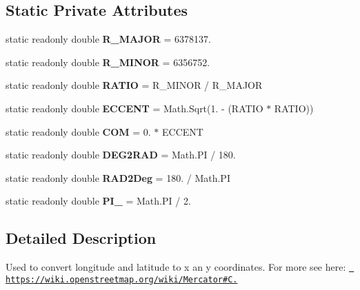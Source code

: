 \subsection*{Static Private Attributes}
\begin{DoxyCompactItemize}
\item 
\mbox{\label{class_mercator_projection_a68ee9a5cb453072e303f1ed6a4928ad4}} 
static readonly double {\bfseries R\+\_\+\+M\+A\+J\+OR} = 6378137.
\item 
\mbox{\label{class_mercator_projection_a8ddf9c3841452f1669e9f086a63a0660}} 
static readonly double {\bfseries R\+\_\+\+M\+I\+N\+OR} = 6356752.
\item 
\mbox{\label{class_mercator_projection_a56e34a362762f6a07456f8a9fe84b7e0}} 
static readonly double {\bfseries R\+A\+T\+IO} = R\+\_\+\+M\+I\+N\+OR / R\+\_\+\+M\+A\+J\+OR
\item 
\mbox{\label{class_mercator_projection_a488fc90a52aa4feef3c1f5f24c1df714}} 
static readonly double {\bfseries E\+C\+C\+E\+NT} = Math.\+Sqrt(1. -\/ (R\+A\+T\+IO $\ast$ R\+A\+T\+IO))
\item 
\mbox{\label{class_mercator_projection_a0e424122a881e32704357c66417f8b7c}} 
static readonly double {\bfseries C\+OM} = 0. $\ast$ E\+C\+C\+E\+NT
\item 
\mbox{\label{class_mercator_projection_a7672295cba80fcc85141626e2d54e8a4}} 
static readonly double {\bfseries D\+E\+G2\+R\+AD} = Math.\+PI / 180.
\item 
\mbox{\label{class_mercator_projection_a2df9659e3bdfaa1e36d3b4d9df5b2a60}} 
static readonly double {\bfseries R\+A\+D2\+Deg} = 180. / Math.\+PI
\item 
\mbox{\label{class_mercator_projection_a5480d18ad3ae690a4c708f1fccdee636}} 
static readonly double {\bfseries P\+I\+\_} = Math.\+PI / 2.
\end{DoxyCompactItemize}


\subsection{Detailed Description}
Used to convert longitude and latitude to x an y coordinates. For more see here\+: \href{https://wiki.openstreetmap.org/wiki/Mercator\#C.23}{\texttt{ https\+://wiki.\+openstreetmap.\+org/wiki/\+Mercator\#\+C.}} 

